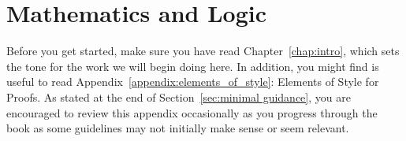 \chapter{Mathematics and Logic}\label{chap:IntroToMath}

Before you get started, make sure you have read Chapter~\ref{chap:intro}, which sets the tone for the work we will begin doing here. In addition, you might find is useful to read Appendix~\ref{appendix:elements_of_style}: Elements of Style for Proofs. As stated at the end of Section~\ref{sec:minimal guidance}, you are encouraged to review this appendix occasionally as you progress through the book as some guidelines may not initially make sense or seem relevant.